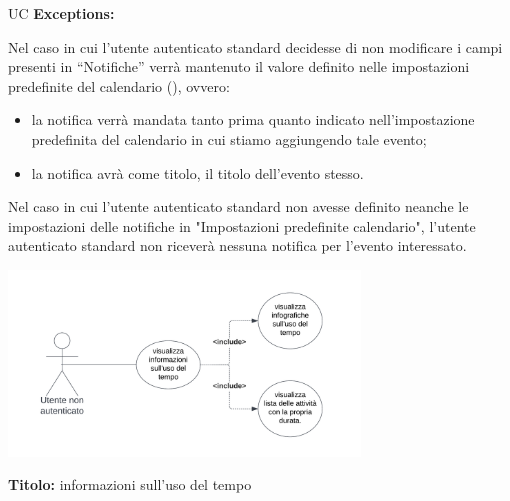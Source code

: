 \begin{listaPersonale}{UC}
    \textbf{Exceptions:}
    \begin{enumerate}[label=\textbf{[exception \arabic{enumii}]}, ref= \textbf{[exception \arabic{enumii}]}]
         Nel caso in cui l'utente autenticato standard decidesse di non modificare i campi presenti in “Notifiche” verrà mantenuto il valore definito nelle impostazioni predefinite del calendario (), ovvero:
        \begin{itemize}
            \item la notifica verrà mandata tanto prima quanto indicato nell'impostazione predefinita del calendario in cui stiamo aggiungendo tale evento;
            \item la notifica avrà come titolo, il titolo dell'evento stesso.
        \end{itemize}
         Nel caso in cui l'utente autenticato standard non avesse definito neanche le impostazioni delle notifiche in "Impostazioni predefinite calendario", l'utente autenticato standard non riceverà nessuna notifica per l'evento interessato.
    \end{enumerate}









    \newpage


    \begin{center}
        \includegraphics[width=0.7\textwidth]{img/Diagrammi/UseCases/UsoDelTempo.png}
    \end{center}

    \textbf{Titolo:} informazioni sull'uso del tempo


\end{listaPersonale}
